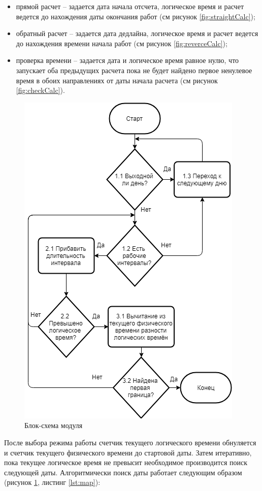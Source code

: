 \begin{itemize}
	\item прямой расчет -- задается дата начала отсчета, логическое время и расчет ведется до нахождения даты окончания работ (см рисунок \ref{fig:straightCalc});
	\item обратный расчет -- задается дата дедлайна, логическое время и расчет ведется до нахождения времени начала работ (см рисунок \ref{fig:reverceCalc});
	\item проверка времени -- задается дата и логическое время равное нулю, что запускает оба предыдущих расчета пока не будет найдено первое ненулевое время в обоих направлениях от даты начала расчета (см рисунок \ref{fig:checkCalc}).
\end{itemize}

\begin{figure}[h!]
	\centering
	\includegraphics[width=0.7\linewidth]{pics/scheduleSchema.png}
	\caption{Блок-схема модуля}
	\label{fig:schema}
\end{figure}

\indent После выбора режима работы счетчик текущего логического времени обнуляется и счетчик текущего физического времени до стартовой даты. Затем итеративно, пока текущее логическое время не превысит необходимое производится поиск следующей даты.
Алгоритмически поиск даты работает следующим образом (рисунок \ref{fig:schema}, листинг \ref{lst:map}):

